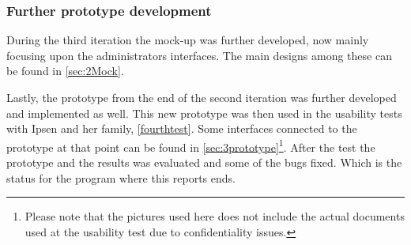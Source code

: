 \subsubsection*{Further prototype development}
During the third iteration the mock-up was further developed, now mainly focusing upon the administrators interfaces.
The main designs among these can be found in \cref{sec:2Mock}.

Lastly,  the prototype from the end of the second iteration was further developed and implemented as well.
This new prototype was then used in the usability tests with Ipsen and her family, \cref{fourthtest}.
Some interfaces connected to the prototype at that point can be found in \cref{sec:3prototype}\footnote{Please note that the pictures used here does not include the actual documents used at the usability test due to confidentiality issues.}.
After the test the prototype and the results was evaluated and some of the bugs fixed.
Which is the status for the program where this reports ends.
